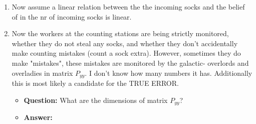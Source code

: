 \begin{enumerate}
    \item Now assume a linear relation between the the incoming socks and the belief of in the nr of incoming socks is linear.
    \item Now the workers at the counting stations are being strictly monitored, whether they do not steal any socks, and whether they don't accidentally make counting mistakes (count a sock extra). However, sometimes they do make "mistakes", these mistakes are monitored by the galactic- overlords and overladies in matrix $P_{yy}$. I don't know how many numbers it has. Additionally this is most likely a candidate for the TRUE ERROR.
    \begin{itemize}
        \item \textbf{Question:} What are the dimensions of matrix $P_{yy}$?
        \item \textbf{Answer:}
    \end{itemize}
\end{enumerate}
